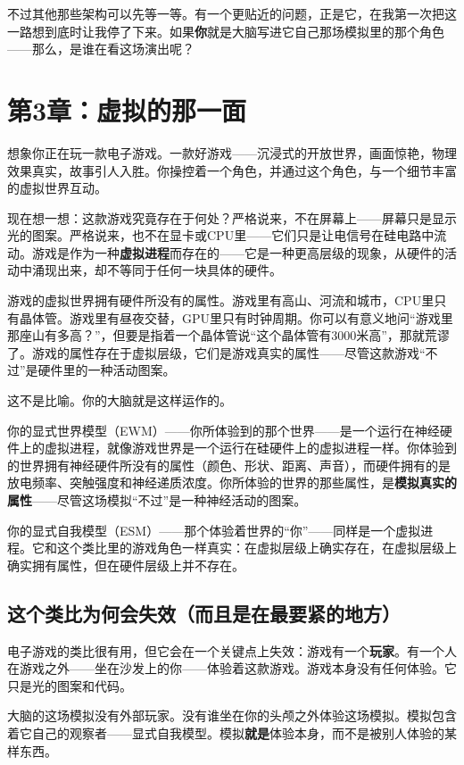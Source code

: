 \documentclass[11pt, twoside, openright]{book}
\begin{document}
不过其他那些架构可以先等一等。有一个更贴近的问题，正是它，在我第一次把这一路想到底时让我停了下来。如果\textbf{你}就是大脑写进它自己那场模拟里的那个角色------那么，是谁在看这场演出呢？


\chapter*{第3章：虚拟的那一面}

想象你正在玩一款电子游戏。一款好游戏------沉浸式的开放世界，画面惊艳，物理效果真实，故事引人入胜。你操控着一个角色，并通过这个角色，与一个细节丰富的虚拟世界互动。

现在想一想：这款游戏究竟存在于何处？严格说来，不在屏幕上------屏幕只是显示光的图案。严格说来，也不在显卡或CPU里------它们只是让电信号在硅电路中流动。游戏是作为一种\textbf{虚拟进程}而存在的------它是一种更高层级的现象，从硬件的活动中涌现出来，却不等同于任何一块具体的硬件。

游戏的虚拟世界拥有硬件所没有的属性。游戏里有高山、河流和城市，CPU里只有晶体管。游戏里有昼夜交替，GPU里只有时钟周期。你可以有意义地问“游戏里那座山有多高？”，但要是指着一个晶体管说“这个晶体管有3000米高”，那就荒谬了。游戏的属性存在于虚拟层级，它们是游戏真实的属性------尽管这款游戏“不过”是硬件里的一种活动图案。

这不是比喻。你的大脑就是这样运作的。

你的显式世界模型（EWM）------你所体验到的那个世界------是一个运行在神经硬件上的虚拟进程，就像游戏世界是一个运行在硅硬件上的虚拟进程一样。你体验到的世界拥有神经硬件所没有的属性（颜色、形状、距离、声音），而硬件拥有的是放电频率、突触强度和神经递质浓度。你所体验的世界的那些属性，是\textbf{模拟真实的属性}------尽管这场模拟“不过”是一种神经活动的图案。

你的显式自我模型（ESM）------那个体验着世界的“你”------同样是一个虚拟进程。它和这个类比里的游戏角色一样真实：在虚拟层级上确实存在，在虚拟层级上确实拥有属性，但在硬件层级上并不存在。

\section*{这个类比为何会失效（而且是在最要紧的地方）}

电子游戏的类比很有用，但它会在一个关键点上失效：游戏有一个\textbf{玩家}。有一个人在游戏之外------坐在沙发上的你------体验着这款游戏。游戏本身没有任何体验。它只是光的图案和代码。

大脑的这场模拟没有外部玩家。没有谁坐在你的头颅之外体验这场模拟。模拟包含着它自己的观察者------显式自我模型。模拟\textbf{就是}体验本身，而不是被别人体验的某样东西。
\end{document}
